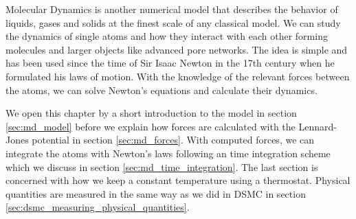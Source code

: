 Molecular Dynamics is another numerical model that describes the behavior of liquids, gases and solids at the finest scale of any classical model. We can study the dynamics of single atoms and how they interact with each other forming molecules and larger objects like advanced pore networks. The idea is simple and has been used since the time of Sir Isaac Newton in the 17th century when he formulated his laws of motion. With the knowledge of the relevant forces between the atoms, we can solve Newton's equations and calculate their dynamics.

We open this chapter by a short introduction to the model in section \ref{sec:md_model} before we explain how forces are calculated with the Lennard-Jones potential in section \ref{sec:md_forces}. With computed forces, we can integrate the atoms with Newton's laws following an time integration scheme which we discuss in section \ref{sec:md_time_integration}. The last section is concerned with how we keep a constant temperature using a thermostat. Physical quantities are measured in the same way as we did in DSMC in section \ref{sec:dsmc_measuring_physical_quantities}.
